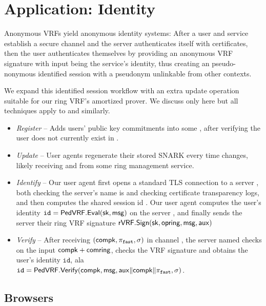 \section{Application: Identity}
\label{sec:app_identity}

Anonymous VRFs yield anonymous identity systems:
After a user and service establish a secure channel and
the server authenticates itself with certificates, then
the user authenticates themselves by providing an anonymous
VRF signature with input \msg being the service's identity,
thus creating an pseudo-nonymous identified session with
a pseudonym unlinkable from other contexts.

We expand this identified session workflow with an extra
update operation suitable for our ring VRF's amortized prover.
We discuss only \pifast here but all techniques apply to \pisk and \pipk similarly. 

\begin{itemize}
\item {\em Register} --
 Adds users' public key commitments into some \ring,
 after verifying the user does not currently exist in \ring.
\item {\em Update} --
 User agents regenerate their stored SNARK \pifast every time \ring changes,
 likely receiving \comring and \openring from some ring management service.
\item {\em Identify} --
 Our user agent first opens a standard TLS connection to a server \msg,
 both checking the server's name is \msg and checking certificate
 transparency logs, and then computes the shared session id \aux.
 Our user agent computes the user's identity
  $\mathtt{id} = {\mathsf{PedVRF}}.{\mathsf{Eval}}(\mathsf{sk},\mathsf{msg})$ on the server \msg,
 and finally sends the server their ring VRF signature
 ${\mathsf{rVRF}}.{\mathsf{Sign}}(\mathsf{sk},\mathsf{opring},\mathsf{msg},\mathsf{aux})$ %
\item {\em Verify} -- 
 After receiving $(\mathsf{compk},\pi_{\mathtt{fast}},\sigma)$ in channel \aux,
 the server named \msg checks \pifast on the input $\mathsf{compk} + \mathsf{comring}$,
 checks the VRF signature and obtains the user's identity $\mathtt{id}$, ala \\
 $\mathtt{id} = {\mathsf{PedVRF}}.{\mathsf{Verify}}(\mathsf{compk},\mathsf{msg},\mathsf{aux} \| \mathsf{compk} \| \pi_{\mathtt{fast}},\sigma)$.
\end{itemize}


\subsection{Browsers}

